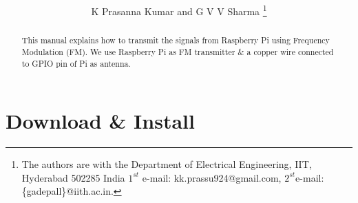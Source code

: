 \documentclass[journal,12pt,twocolumn]{IEEEtran}
\begin{document}

 
\title{
} 
 
%
%
%

\author{K Prasanna Kumar and G V V Sharma %
\thanks{The authors are with the Department
of Electrical Engineering, IIT, Hyderabad
502285 India $1^{st}$ e-mail: kk.prassu924@gmail.com, $2^{st}$e-mail: \{gadepall\}@iith.ac.in. 
}}



\maketitle


\tableofcontents

\bigskip

\begin{abstract}
This manual explains how to transmit the signals from Raspberry Pi using Frequency Modulation (FM). We use Raspberry Pi as FM transmitter \&  a copper wire connected to GPIO pin of Pi as antenna.  
\end{abstract}

\section{Download \& Install}
\end{document}
